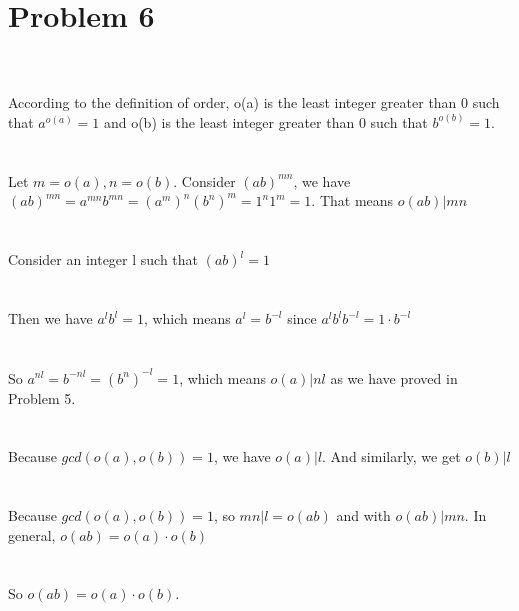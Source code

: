 \documentclass{article}
\begin{document}
\section{Problem 6}
\\ \hspace*{\fill} \\
According to the definition of order, o(a) is the least integer greater than 0 such that $a^{o(a)} = 1$ and o(b) is the least integer greater than 0 such that $b^{o(b)} = 1$.\\
\\ \hspace*{\fill} \\
Let $m = o(a), n = o(b)$. Consider $(ab)^{mn}$, we have $(ab)^{mn} = a^{mn}b^{mn} = (a^m)^n(b^n)^m = 1^n1^m = 1$. That means $o(ab) | mn$\\
\\ \hspace*{\fill} \\
Consider an integer l such that $(ab)^l = 1$\\
\\ \hspace*{\fill} \\
Then we have $a^{l}b^{l} = 1$, which means $a^{l} = b^{-l}$ since $a^l b^l b^{-l} = 1 \cdot b^{-l}$\\
\\ \hspace*{\fill} \\
So $a^{nl} = b^{-nl} = (b^n)^{-l} = 1$, which means $o(a) | nl$ as we have proved in Problem 5.\\
\\ \hspace*{\fill} \\
Because $gcd(o(a),o(b))=1$, we have $o(a) | l$. And similarly, we get $o(b) | l$\\
\\ \hspace*{\fill} \\
Because $gcd(o(a),o(b))=1$, so $mn | l=o(ab)$ and with $o(ab) | mn$. In general, $o(ab) = o(a) \cdot o(b)$\\
\\ \hspace*{\fill} \\
So $o(ab) = o(a) \cdot o(b)$.\\
\end{document}
